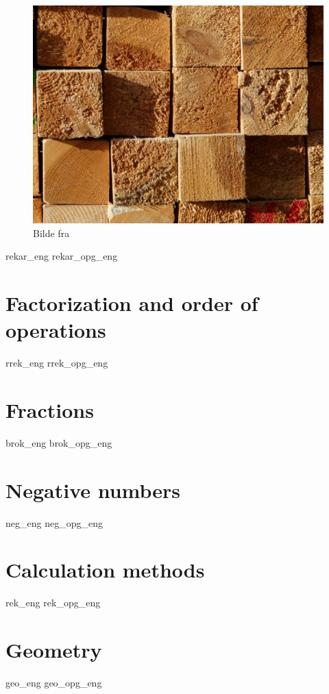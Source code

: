 \begin{figure}
	\centering
	\includegraphics[scale=0.38]{wood} \\
	{\footnotesize Bilde fra } 
\end{figure}
\newpage
{rekar_eng}
{rekar_opg_eng}

\chapter{Factorization and order of operations}
\newpage
{rrek_eng}
{rrek_opg_eng}

\chapter{Fractions}
\newpage
{brok_eng}
{brok_opg_eng}

\chapter{Negative numbers \label{Negtal}}
\newpage
{neg_eng}
{neg_opg_eng}

\chapter{Calculation methods}
\newpage
{rek_eng}
{rek_opg_eng}

\chapter{Geometry}
\newpage
{geo_eng}
{geo_opg_eng}

